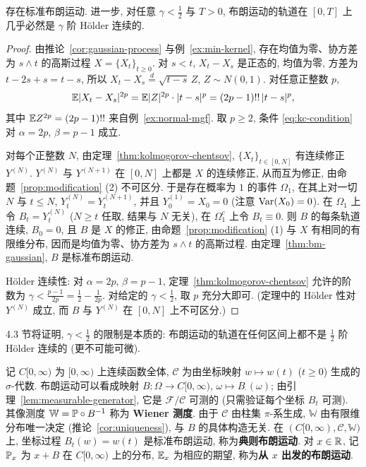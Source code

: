 \begin{theorem}[布朗运动的存在性]\label{thm:bm-existence}
存在标准布朗运动. 进一步, 对任意 $\gamma<\frac{1}{2}$ 与 $T>0$, 布朗运动的轨道在 $[0,T]$ 上几乎必然是 $\gamma$ 阶 H\"older 连续的.
\end{theorem}

\begin{proof}
由推论~\ref{cor:gaussian-process} 与例~\ref{ex:min-kernel}, 存在均值为零、协方差为 $s\wedge t$ 的高斯过程 $X=\{X_t\}_{t\ge0}$. 对 $s<t$, $X_t-X_s$ 是正态的, 均值为零, 方差为 $t-2s+s=t-s$, 所以 $X_t-X_s\overset{d}{=}\sqrt{t-s}\,Z$, $Z\sim N(0,1)$. 对任意正整数 $p$,
\[
\E\abs{X_t-X_s}^{2p}=\E\abs{Z}^{2p}\cdot\abs{t-s}^p=(2p-1)!!\,\abs{t-s}^p,
\]
其中 $\E Z^{2p}=(2p-1)!!$ 来自例~\ref{ex:normal-mgf}. 取 $p\ge2$, 条件 \eqref{eq:kc-condition} 对 $\alpha=2p$, $\beta=p-1$ 成立.

对每个正整数 $N$, 由定理~\ref{thm:kolmogorov-chentsov}, $\{X_t\}_{t\in[0,N]}$ 有连续修正 $Y^{(N)}$. $Y^{(N)}$ 与 $Y^{(N+1)}$ 在 $[0,N]$ 上都是 $X$ 的连续修正, 从而互为修正, 由命题~\ref{prop:modification} (2) 不可区分. 于是存在概率为 $1$ 的事件 $\Omega_1$, 在其上对一切 $N$ 与 $t\le N$, $Y^{(N)}_t=Y^{(N+1)}_t$, 并且 $Y^{(1)}_0=X_0=0$ (注意 $\Var(X_0)=0$). 在 $\Omega_1$ 上令 $B_t=Y^{(N)}_t$ ($N\ge t$ 任取, 结果与 $N$ 无关), 在 $\Omega_1^c$ 上令 $B_t\equiv0$. 则 $B$ 的每条轨道连续, $B_0=0$, 且 $B$ 是 $X$ 的修正, 由命题~\ref{prop:modification} (1) 与 $X$ 有相同的有限维分布, 因而是均值为零、协方差为 $s\wedge t$ 的高斯过程. 由定理~\ref{thm:bm-gaussian}, $B$ 是标准布朗运动.

H\"older 连续性: 对 $\alpha=2p$, $\beta=p-1$, 定理~\ref{thm:kolmogorov-chentsov} 允许的阶数为 $\gamma<\frac{p-1}{2p}=\frac{1}{2}-\frac{1}{2p}$. 对给定的 $\gamma<\frac{1}{2}$, 取 $p$ 充分大即可. (定理中的 H\"older 性对 $Y^{(N)}$ 成立, 而 $B$ 与 $Y^{(N)}$ 在 $[0,N]$ 上不可区分.)
\end{proof}

4.3 节将证明, $\gamma<\frac{1}{2}$ 的限制是本质的: 布朗运动的轨道在任何区间上都不是 $\frac{1}{2}$ 阶 H\"older 连续的 (更不可能可微).

\begin{remark}
记 $C[0,\infty)$ 为 $[0,\infty)$ 上连续函数全体, $\mathcal{C}$ 为由坐标映射 $w\mapsto w(t)$ ($t\ge0$) 生成的 $\sigma$-代数. 布朗运动可以看成映射 $B:\Omega\to C[0,\infty)$, $\omega\mapsto B_\cdot(\omega)$; 由引理~\ref{lem:measurable-generator}, 它是 $\mathcal{F}/\mathcal{C}$ 可测的 (只需验证每个坐标 $B_t$ 可测). 其像测度 $\mathbb{W}=\P\circ B^{-1}$ 称为 \textbf{Wiener 测度}. 由于 $\mathcal{C}$ 由柱集 $\pi$-系生成, $\mathbb{W}$ 由有限维分布唯一决定 (推论~\ref{cor:uniqueness}), 与 $B$ 的具体构造无关. 在 $(C[0,\infty),\mathcal{C},\mathbb{W})$ 上, 坐标过程 $B_t(w)=w(t)$ 是标准布朗运动, 称为\textbf{典则布朗运动}. 对 $x\in\R$, 记 $\P_x$ 为 $x+B$ 在 $C[0,\infty)$ 上的分布, $\E_x$ 为相应的期望, 称为\textbf{从 $x$ 出发的布朗运动}.
\end{remark}

